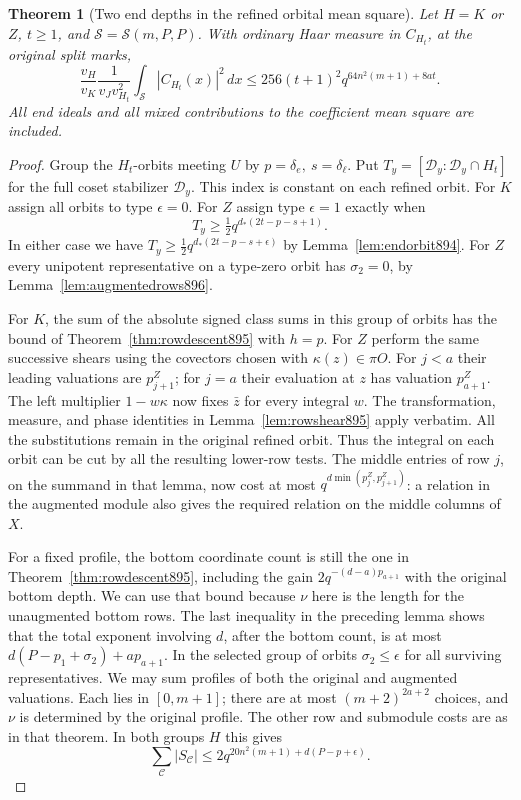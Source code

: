 \documentclass[a4paper,11pt]{article}
\newtheorem{theorem}[proposition]{Theorem}
\theoremstyle{definition}
\theoremstyle{remark}
\numberwithin{equation}{section}
\begin{document}
\begin{theorem}[Two end depths in the refined orbital mean square]
\leavevmode\label{thm:twodepth896}
Let \(H=K\) or \(Z\), \(t\ge1\), and
\(\mathcal S=\mathcal S(m,P,P)\). With ordinary Haar measure in
\(C_{H_t}\), at the original split marks,
\begin{equation}
 \frac{v_H}{v_K}\frac1{v_Jv_{H_t}^2}
                \int_{\mathcal S}|C_{H_t}(x)|^2\,dx
 \le  256(t+1)^2q^{64n^2(m+1)+8at}.
 \label{eq:twodepth896}
\end{equation}
All end ideals and all mixed contributions to the coefficient
mean square are included.
\end{theorem}
\begin{proof}
Group the \(H_t\)-orbits meeting \(U\) by
\(p=\delta_e,\ s=\delta_\ell\). Put \(T_y=[\mathcal D_y:
\mathcal D_y\cap H_t]\) for the full coset stabilizer
\(\mathcal D_y\). This index is constant on each refined orbit.
For \(K\) assign all orbits to type \(\epsilon=0\). For \(Z\)
assign type \(\epsilon=1\) exactly when
\[
               T_y\ge\tfrac12 q^{d_*(2t-p-s+1)} .
\]
In either case we have
\(T_y\ge\tfrac12q^{d_*(2t-p-s+\epsilon)}\) by
Lemma~\ref{lem:endorbit894}. For \(Z\) every unipotent
representative on a type-zero orbit has \(\sigma_2=0\), by
Lemma~\ref{lem:augmentedrows896}.

For \(K\), the sum of the absolute signed class sums in this
group of orbits has the bound of Theorem~\ref{thm:rowdescent895}
with \(h=p\). For \(Z\) perform the same successive shears using
the covectors chosen with \(\kappa(z)\in\pi O\). For \(j<a\)
their leading valuations are \(p_{j+1}^Z\); for \(j=a\) their
evaluation at \(z\) has valuation \(p_{a+1}^Z\).
The left multiplier \(1-w\kappa\) now fixes \(\bar z\) for every
integral \(w\). The transformation, measure, and phase identities
in Lemma~\ref{lem:rowshear895} apply verbatim. All the substitutions
remain in the original refined orbit. Thus the integral on each
orbit can be cut by all the resulting lower-row tests. The
middle entries of row \(j\), on the summand in that lemma, now
cost at most \(q^{d\min(p_j^Z,p_{j+1}^Z)}\): a relation in the
augmented module also gives the required relation on the middle
columns of \(X\).

For a fixed profile, the bottom coordinate count is still the
one in Theorem~\ref{thm:rowdescent895}, including the gain
\(2q^{-(d-a)p_{a+1}}\) with the original bottom depth. We can
use that bound because \(\nu\) here is the length for the
unaugmented bottom rows. The last inequality in the preceding
lemma shows that the total exponent involving \(d\), after the
bottom count, is at most \(d(P-p_1+\sigma_2)+a p_{a+1}\).
In the selected group of orbits \(\sigma_2\le\epsilon\) for all
surviving representatives. We may sum profiles of both the
original and augmented valuations. Each lies in \([0,m+1]\);
there are at most \((m+2)^{2a+2}\) choices, and \(\nu\) is
determined by the original profile. The other row and submodule
costs are as in that theorem. In both groups \(H\) this gives
\[
        \sum_{\mathcal C}|S_{\mathcal C}|
          \le 2q^{20n^2(m+1)+d(P-p+\epsilon)} .
\]


\end{proof}
\end{document}
